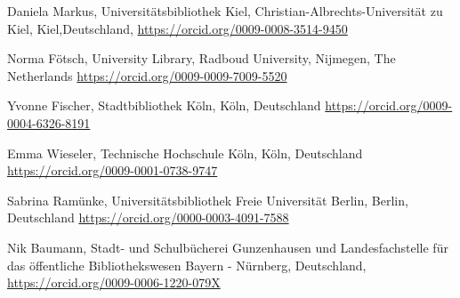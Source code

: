 \documentclass[a4paper,
fontsize=11pt,
oneside,
numbers=noperiodatend,
parskip=half-,
bibliography=totoc,
final
]{scrartcl}
\begin{document}
Daniela Markus, Universitätsbibliothek Kiel, Christian-Albrechts-Universität zu Kiel, Kiel,\linebreak Deutschland, \url{https://orcid.org/0009-0008-3514-9450}

Norma Fötsch, University Library, Radboud University, Nijmegen, The Netherlands\newline
\url{https://orcid.org/0009-0009-7009-5520}

Yvonne Fischer, Stadtbibliothek Köln, Köln, Deutschland\newline
\url{https://orcid.org/0009-0004-6326-8191}

Emma Wieseler, Technische Hochschule Köln, Köln, Deutschland\newline
\url{https://orcid.org/0009-0001-0738-9747}

Sabrina Ramünke, Universitätsbibliothek Freie Universität Berlin, Berlin, Deutschland\newline
\url{https://orcid.org/0000-0003-4091-7588}

Nik Baumann, Stadt- und Schulbücherei Gunzenhausen und Landesfachstelle für das öffentliche Bibliothekswesen Bayern - Nürnberg, Deutschland, \url{https://orcid.org/0009-0006-1220-079X}
\end{document}
